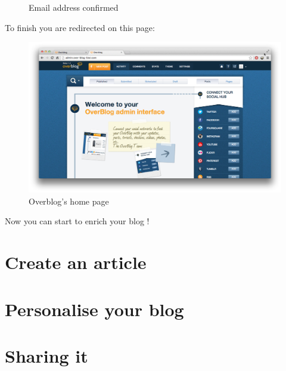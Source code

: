 \documentclass[a4paper,10pt]{article}
\begin{document}
\begin{enumerate}
\begin{figure}[H]
    \caption{Email address confirmed}
\end{figure}
To finish you are redirected on this page:
\begin{figure}[H]
    \center
	\includegraphics[width=13cm]{Images/overblogPage.png}
    \caption{Overblog's home page}
\end{figure}
Now you can start to enrich your blog !
\end{enumerate}


\newpage
\section{Create an article}



\newpage
\section{Personalise your blog}


\newpage
\section{Sharing it}
\end{document}
